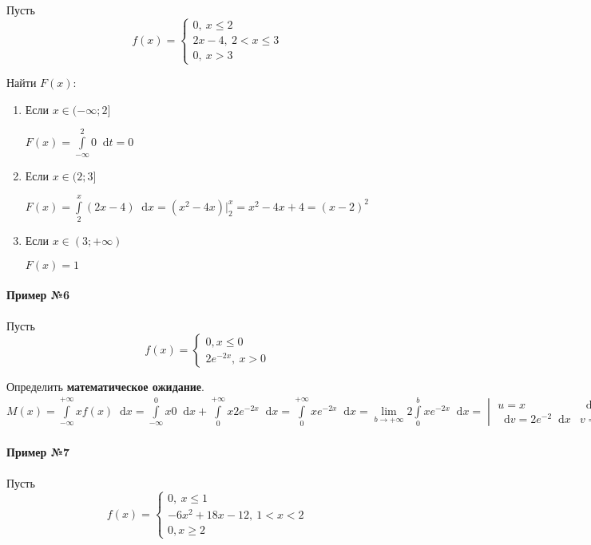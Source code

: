 \documentclass{article}
\newcommand*\diff{\mathop{}\!\mathrm{d}}
\begin{document}
Пусть $$f(x) = \begin{cases}
    0, \ x \le 2 \\
    2x - 4, \ 2 < x \le 3 \\
    0, \ x > 3
\end{cases}$$

Найти $F(x)$:

\begin{enumerate}
    \item Если $x \in (-\infty; 2]$
    
    $F(x) = \int\limits_{-\infty}^{2} 0 \diff t = 0$
    \item Если $x \in (2; 3]$
    
    $F(x) = \int\limits_{2}^{x} (2x - 4) \diff x = (x^2 - 4x) \bigg|_{2}^{x} = x^2 - 4x + 4 = (x-2)^2$
    \item Если $x \in (3; +\infty)$
    
    $F(x) = 1$
\end{enumerate}

\paragraph{Пример №6}

Пусть $$f(x) = \begin{cases}
    0, x \le 0 \\
    2e^{-2x}, \ x > 0 
\end{cases}$$

Определить \textbf{математическое ожидание}. $M(x) = \int\limits_{-\infty}^{+\infty} x f(x) \diff x = \int\limits_{-\infty}^{0} x 0 \diff x + \int\limits_{0}^{+\infty} x 2 e^{-2x} \diff x = \int\limits_{0}^{+\infty} x e^{-2x} \diff x = \lim\limits_{b \to +\infty} 2 \int\limits_{0}^{b} x e^{-2x} \diff x = \begin{vmatrix}
    u = x & \diff u = \diff x \\
    \diff v = 2 e^{-2} \diff x & v = -e^{-2x}
\end{vmatrix} = \lim\limits_{b \to +\infty} (-x e^{- 2x} \bigg|_0^b + \int\limits_{0}^{b} e^{-2x} \diff x) = \lim\limits_{b \to +\infty} (-b e^{- 2 b} - \frac{1}{2} e^{-2x} \bigg|_{0}^{b}) = \lim\limits_{b \to +\infty} (-b e^{-2 b} - \frac{1}{2} e^{-2b} + \frac{1}{2}) = 0.5$

\paragraph{Пример №7}

Пусть $$f(x) = \begin{cases}
    0, \ x \le 1 \\
    -6x^2 + 18x - 12, \ 1 < x < 2 \\
    0, x \ge 2
\end{cases}$$
\end{document}
